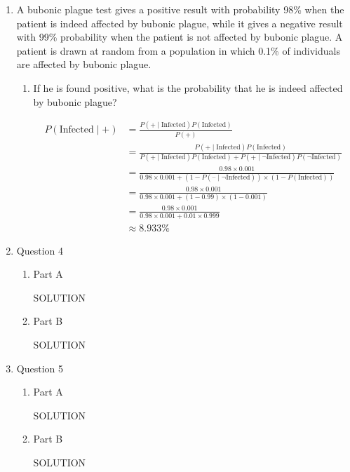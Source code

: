\documentclass[12pt]{article}
\begin{document}
\begin{enumerate}
\item A bubonic plague test gives a positive result with probability 98\% when the patient is indeed affected by bubonic plague, while it gives a negative result with 99\% probability when the patient is not affected by bubonic plague. A patient is drawn at random from a population in which 0.1\% of individuals are affected by bubonic plague.
  \begin{enumerate}
  \item If he is found positive, what is the probability that he is indeed affected by bubonic plague?

    \begin{align*}
        P(\text{Infected}\mid\text{+}) &= \frac{P(\text{+}\mid\text{Infected}) P(\text{Infected})}{P(+)} \\
        &= \frac{P(\text{+}\mid\text{Infected}) P(\text{Infected})}{P(\text{+}\mid\text{Infected}) P(\text{Infected}) + P(\text{+}\mid\neg\text{Infected}) P(\neg\text{Infected})} \\[8pt]
        &= \frac{0.98 \times 0.001}{0.98 \times 0.001 + (1 - P(\text{--}\mid\neg\text{Infected})) \times (1 - P(\text{Infected}))} \\[8pt]
        &= \frac{0.98 \times 0.001}{0.98 \times 0.001 + (1 - 0.99) \times (1 - 0.001)} \\[8pt]
        &= \frac{0.98 \times 0.001}{0.98 \times 0.001 + 0.01 \times 0.999} \\[8pt]
        &\approx 8.933\%
    \end{align*}

  \end{enumerate}
\newpage

\item Question 4
  \begin{enumerate}
  \item Part A

  SOLUTION

  \item Part B

  SOLUTION
  \end{enumerate}
\newpage

\item Question 5
  \begin{enumerate}
  \item Part A

  SOLUTION

  \item Part B

  SOLUTION
  \end{enumerate}
\newpage

\end{enumerate}
\end{document}
